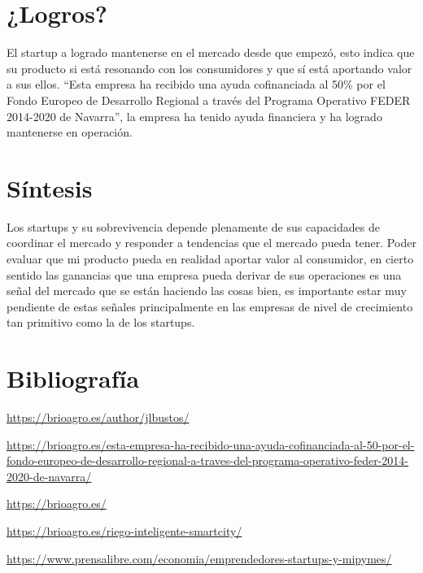 \documentclass{article}
\begin{document}
\section{¿Logros?}
El startup a logrado mantenerse en el mercado desde que empezó, esto indica que su producto si está resonando con los consumidores y que sí está aportando valor a sus ellos. ``Esta empresa ha recibido una ayuda cofinanciada al 50\% por el Fondo Europeo de Desarrollo Regional a través del Programa Operativo FEDER 2014-2020 de Navarra'', la empresa ha tenido ayuda financiera y ha logrado mantenerse en operación.



\section{Síntesis}
Los startups y su sobrevivencia depende plenamente de sus capacidades de coordinar el mercado y responder a tendencias que el mercado pueda tener. Poder evaluar que mi producto pueda en realidad aportar valor al consumidor, en cierto sentido las ganancias que una empresa pueda derivar de sus operaciones es una señal del mercado que se están haciendo las cosas bien, es importante estar muy pendiente de estas señales principalmente en las empresas de nivel de crecimiento tan primitivo como la de los startups.


\section{Bibliografía}
\begin{enumerate}[label={[\arabic*]}]
    \item \url{https://brioagro.es/author/jlbustos/}
    \item \url{https://brioagro.es/esta-empresa-ha-recibido-una-ayuda-cofinanciada-al-50-por-el-fondo-europeo-de-desarrollo-regional-a-traves-del-programa-operativo-feder-2014-2020-de-navarra/}
    \item \url{https://brioagro.es/}
    \item \url{https://brioagro.es/riego-inteligente-smartcity/}
    \item \url{https://www.prensalibre.com/economia/emprendedores-startups-y-mipymes/}
\end{enumerate}
\end{document}
